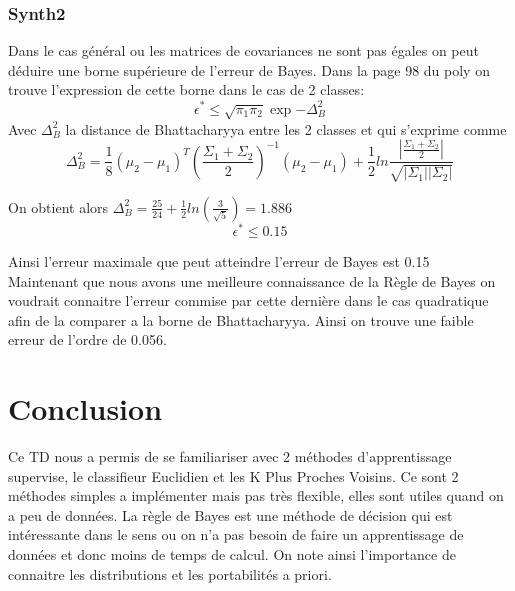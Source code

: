 \documentclass[10pt]{article}
\begin{document}
\subsubsection{Synth2}
Dans le cas général ou les matrices de covariances ne sont pas égales on peut déduire une borne supérieure de l'erreur de Bayes. Dans la page 98 du  poly on trouve l'expression de cette borne dans le  cas de 2 classes:
\[ \epsilon^{*} \leq \sqrt{\pi_{1}\pi_{2}}  \exp{-\Delta_{B}^{2}} \]
Avec $\Delta_{B}^{2}$ la distance de Bhattacharyya entre les 2 classes et qui s'exprime comme 
\[  \Delta_{B}^{2} = \frac{1}{8} (\mu_{2} - \mu_{1})^{T}  (\frac{\Sigma_{1} + \Sigma_{2}}{2})^{-1} (\mu_{2} - \mu_{1}) + 
\frac{1}{2} ln\frac{|\frac{\Sigma_{1}+\Sigma_{2}}{2}|}{\sqrt{|\Sigma_{1}| |\Sigma_{2}|}} \]

On obtient alors $\Delta_{B}^{2} = \frac{25}{24} +\frac{1}{2} ln(\frac{3}{\sqrt{5}} ) = 1.886$
\[  \epsilon^{*} \leq 0.15\]

Ainsi l'erreur maximale que peut atteindre l'erreur de Bayes est 0.15\\
Maintenant que nous avons une meilleure connaissance de la Règle de Bayes on voudrait connaitre l'erreur commise par cette dernière dans le cas quadratique afin de la comparer a la borne de Bhattacharyya. Ainsi on trouve une faible erreur de l'ordre de 0.056.

\section{Conclusion}
Ce TD nous a permis de se familiariser avec 2 méthodes d'apprentissage supervise, le classifieur Euclidien et les K Plus Proches Voisins.  Ce sont 2 méthodes simples a implémenter mais pas très flexible, elles sont utiles quand on a peu de données. La règle de Bayes est une méthode de décision qui est intéressante dans le sens ou on n'a pas besoin de faire un apprentissage de données et donc moins de temps de calcul. On note ainsi l'importance de connaitre les distributions et les portabilités a priori.
	
\end{document}
